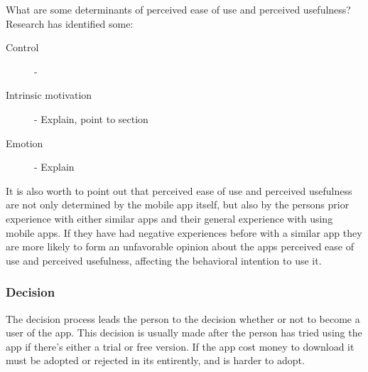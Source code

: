 What are some determinants of perceived ease of use and perceived usefulness? Research has identified some:
\begin{description}
  \item[Control] -
  \item[Intrinsic motivation] - Explain, point to section
  \item[Emotion] - Explain
\end{description}

It is also worth to point out that perceived ease of use and perceived usefulness are not only determined by the mobile app itself, but also by the persons prior experience with either similar apps and their general experience with using mobile apps. If they have had negative experiences before with a similar app they are more likely to form an unfavorable opinion about the apps perceived ease of use and perceived usefulness, affecting the behavioral intention to use it.

\subsubsection{Decision}
The decision process leads the person to the decision whether or not to become a user of the app. This decision is usually made after the person has tried using the app if there's either a trial or free version. If the app cost money to download it must be adopted or rejected in its entirently, and is harder to adopt.


